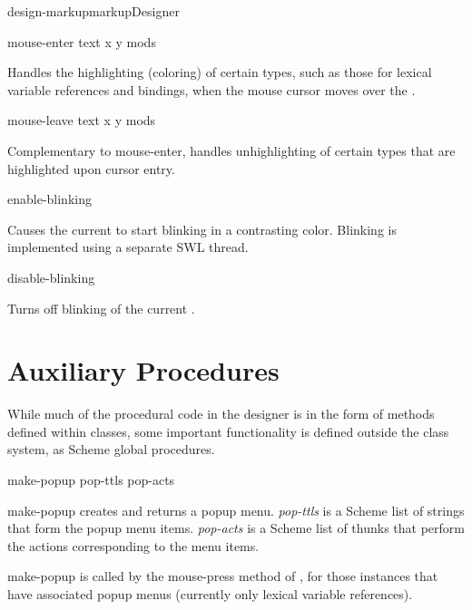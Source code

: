 \documentclass{article}
\begin{document}
\begin{class}{design-markup}{markup}{Designer}
\begin{method}{mouse-enter}{ text x y mods}{}

Handles the highlighting (coloring) of certain 
types, such as those for lexical variable references and bindings,
when the mouse cursor moves over the .

\end{method}


\begin{method}{mouse-leave}{ text x y mods}{}

Complementary to {\sf mouse-enter}, handles unhighlighting of certain
 types that are highlighted upon cursor entry.

\end{method}



\begin{method}{enable-blinking}{}{}

Causes the current  to start blinking in a
contrasting color.  Blinking is implemented using a separate {\sc SWL}
thread.

\end{method}


\begin{method}{disable-blinking}{}{}

Turns off blinking of the current .

\end{method}
\end{class}



\section{Auxiliary Procedures}

While much of the procedural code in the designer is in the form of
methods defined within classes, some important functionality is
defined outside the class system, as Scheme global procedures.



\begin{proc}{make-popup}{ pop-ttls pop-acts}{}

{\sf make-popup} creates and returns a popup menu.  {\sl pop-ttls} is a Scheme
list of strings that form the popup menu items.  {\sl pop-acts} is a Scheme
list of thunks that perform the actions corresponding to the menu
items.

{\sf make-popup} is called by the mouse-press method of , for
those  instances that have associated popup menus (currently only
lexical variable references).
\end{proc}
\end{document}
